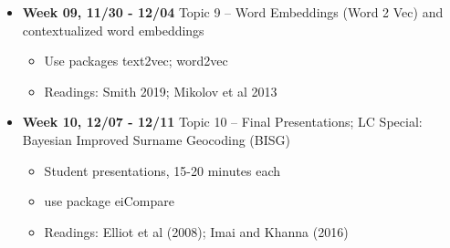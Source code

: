 \documentclass[11pt]{article}
\begin{document}
\begin{itemize}
	\item \textbf{Week 09, 11/30 - 12/04} Topic 9 -- Word Embeddings (Word 2 Vec) and contextualized word embeddings
	\begin{itemize}
	\item Use packages text2vec; word2vec
	\item Readings: Smith 2019; Mikolov et al 2013
	\end{itemize}
\end{itemize}

\begin{itemize}
	\item \textbf{Week 10, 12/07 - 12/11} Topic 10 -- Final Presentations; LC Special: Bayesian Improved Surname Geocoding (BISG)
	\begin{itemize}
	\item Student presentations, 15-20 minutes each
	\item use package eiCompare
	\item Readings: Elliot et al (2008); Imai and Khanna (2016)
	\end{itemize}
\end{itemize}
\end{document}

